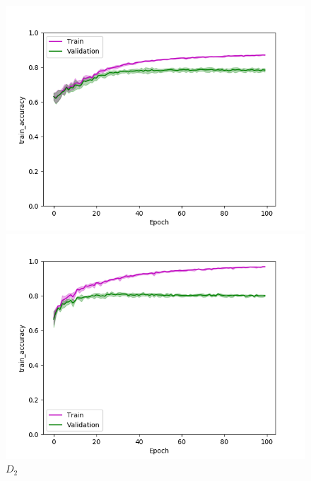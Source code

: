 \def\year{2017}\relax \documentclass[letterpaper]{article}
\begin{document}
\begin{figure}
\centering
\begin{minipage}{.24\textwidth}
  \centering
\includegraphics[width=\textwidth]{pics/d1_train_accuracy_mean_train_test.png}
\caption{$D_1$}\label{fig:d1acctraintest}
\end{minipage}
\begin{minipage}{.01\textwidth}
\end{minipage}
\begin{minipage}{.24\textwidth}
  \centering
\includegraphics[width=\textwidth]{pics/d2_train_accuracy_mean_train_test.png}
\caption{$D_2$}\label{fig:d2acctraintest}
\end{minipage}
\begin{minipage}{.24\textwidth}

\end{minipage}
\end{figure}
\end{document}
